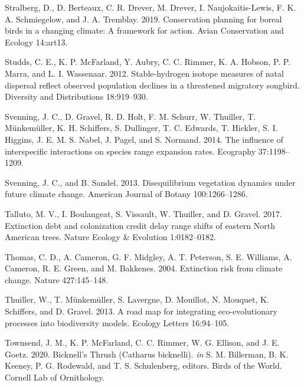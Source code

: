 \documentclass[12pt]{article}
\newlength{\cslhangindent}
\newenvironment{cslreferences}%
  {\setlength{\parindent}{0pt}%
  \everypar{\setlength{\hangindent}{\cslhangindent}}\ignorespaces}%
  {\par}
\begin{document}
\begin{cslreferences}
\leavevmode\hypertarget{ref-stralberg_conservation_2019}{}%
Stralberg, D., D. Berteaux, C. R. Drever, M. Drever, I.
Naujokaitis-Lewis, F. K. A. Schmiegelow, and J. A. Tremblay. 2019.
Conservation planning for boreal birds in a changing climate: A
framework for action. Avian Conservation and Ecology 14:art13.

\leavevmode\hypertarget{ref-studds_stable-hydrogen_2012}{}%
Studds, C. E., K. P. McFarland, Y. Aubry, C. C. Rimmer, K. A. Hobson, P.
P. Marra, and L. I. Wassenaar. 2012. Stable-hydrogen isotope measures of
natal dispersal reflect observed population declines in a threatened
migratory songbird. Diversity and Distributions 18:919--930.

\leavevmode\hypertarget{ref-svenning_influence_2014}{}%
Svenning, J. C., D. Gravel, R. D. Holt, F. M. Schurr, W. Thuiller, T.
Münkemüller, K. H. Schiffers, S. Dullinger, T. C. Edwards, T. Hickler,
S. I. Higgins, J. E. M. S. Nabel, J. Pagel, and S. Normand. 2014. The
influence of interspecific interactions on species range expansion
rates. Ecography 37:1198--1209.

\leavevmode\hypertarget{ref-svenning_disequilibrium_2013}{}%
Svenning, J. C., and B. Sandel. 2013. Disequilibrium vegetation dynamics
under future climate change. American Journal of Botany 100:1266--1286.

\leavevmode\hypertarget{ref-talluto_extinction_2017}{}%
Talluto, M. V., I. Boulangeat, S. Vissault, W. Thuiller, and D. Gravel.
2017. Extinction debt and colonization credit delay range shifts of
eastern North American trees. Nature Ecology \& Evolution 1:0182--0182.

\leavevmode\hypertarget{ref-thomas_extinction_2004}{}%
Thomas, C. D., A. Cameron, G. F. Midgley, A. T. Peterson, S. E.
Williams, A. Cameron, R. E. Green, and M. Bakkenes. 2004. Extinction
risk from climate change. Nature 427:145--148.

\leavevmode\hypertarget{ref-thuiller_road_2013}{}%
Thuiller, W., T. Münkemüller, S. Lavergne, D. Mouillot, N. Mouquet, K.
Schiffers, and D. Gravel. 2013. A road map for integrating
eco-evolutionary processes into biodiversity models. Ecology Letters
16:94--105.

\leavevmode\hypertarget{ref-billerman_bicknells_2020}{}%
Townsend, J. M., K. P. McFarland, C. C. Rimmer, W. G. Ellison, and J. E.
Goetz. 2020. Bicknell's Thrush (Catharus bicknelli). \emph{in} S. M.
Billerman, B. K. Keeney, P. G. Rodewald, and T. S. Schulenberg, editors.
Birds of the World. Cornell Lab of Ornithology.


\end{cslreferences}
\end{document}

